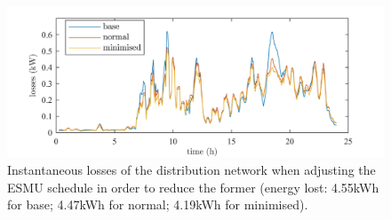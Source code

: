 \begin{figure}\centering
	\includegraphics{_chapter1/fig/results/ts-losses_}
\caption{Instantaneous losses of the distribution network when adjusting the ESMU schedule in order to reduce the former (energy lost: 4.55kWh for base; 4.47kWh for normal; 4.19kWh for minimised).}
\label{ch1:fig:ts-losses}
\end{figure}